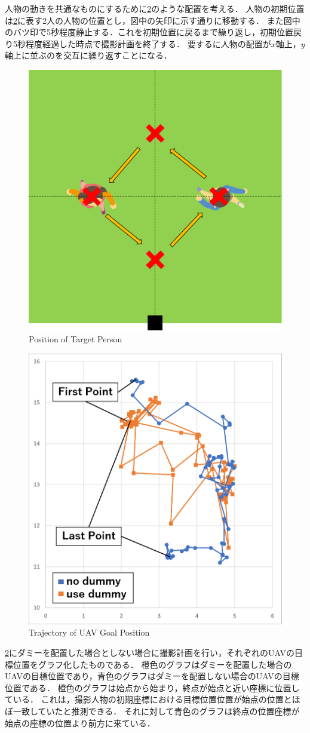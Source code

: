 \documentclass[autodetect-engine,dvipdfmx-if-dvi,ja=standard,a4j,jbase=11pt,magstyle=nomag*]{bxjsreport}
\begin{document}
人物の動きを共通なものにするために\cref{fig:pos_person}のような配置を考える．
人物の初期位置は\cref{fig:pos_person}に表す2人の人物の位置とし，図中の矢印に示す通りに移動する．
また図中のバツ印で5秒程度静止する．これを初期位置に戻るまで繰り返し，初期位置戻り5秒程度経過した時点で撮影計画を終了する．
要するに人物の配置が$x$軸上，$y$軸上に並ぶのを交互に繰り返すことになる．

\begin{figure}[h]
    \centering
    \includegraphics[width=0.5\linewidth, clip]{./figure/chapter5/experience_setting.png}
    \caption{Position of Target Person}
    \label{fig:pos_person}
\end{figure}

\begin{figure}[h]
    \centering
    \includegraphics[width=0.5\linewidth, clip]{./figure/chapter5/goal_graph.png}
    \caption{Trajectory of UAV Goal Position}
    \label{fig:pos_person}
\end{figure}

\cref{fig:pos_person}にダミーを配置した場合としない場合に撮影計画を行い，それぞれのUAVの目標位置をグラフ化したものである．
橙色のグラフはダミーを配置した場合のUAVの目標位置であり，青色のグラフはダミーを配置しない場合のUAVの目標位置である．
橙色のグラフは始点から始まり，終点が始点と近い座標に位置している．
これは，撮影人物の初期座標における目標位置位置が始点の位置とほぼ一致していたと推測できる．
それに対して青色のグラフは終点の位置座標が始点の座標の位置より前方に来ている．
\end{document}
